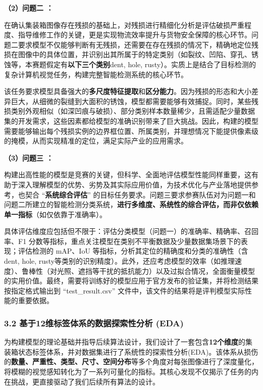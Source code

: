 \documentclass[
]{article}
\begin{document}
\textbf{（2）问题二 ：}

在确认集装箱图像存在残损的基础上，对残损进行精细化分析是评估破损严重程度、指导维修工作的关键，更是实现物流效率提升与货物安全保障的核心环节。问题二要求模型不仅能够判断有无残损，还需要在存在残损的情况下，精确地定位残损在图像中的具体位置，并识别出其所属于的特定类别（如裂纹、凹陷、穿孔、锈蚀等，本赛题假定有\textbf{以下三个类别}dent,
hole,
rusty）。实质上是结合了目标检测的复杂计算机视觉任务，构建完整智能检测系统的核心环节。

该任务要求模型具备强大的\textbf{多尺度特征提取}和\textbf{区分能力}。因为残损的形态和大小差异巨大，从细微的裂缝到大面积的锈蚀，模型都需要能够有效捕捉。同时，某些残损类别外观相似（如深凹痕与破损）、部分类别样本数量稀少，且需适配少量数据集的开发需求，这些因素都给模型的准确识别带来了巨大挑战。因此，构建的模型需要能够输出每个残损实例的边界框位置、所属类别，并理想情况下能提供像素级的掩模，从而实现精准的定位，满足实际产业的应用需求。

\textbf{（3）问题三 ：}

构建出高性能的模型是竞赛的关键，但科学、全面地评估模型性能同样重要，这有助于深入理解模型的优势、劣势及其实际应用价值，为技术优化与产业落地提供参考，也契合
``\textbf{系统综合评估}''
的目标任务要求。问题三要求参赛队伍对为问题一和问题二所建立的智能检测分类系统，\textbf{进行多维度、系统性的综合评估，而非仅依赖单一指标}（如仅依靠于准确率）。

具体评估维度应包括但不限于：评估分类模型（问题一）的准确率、精确率、召回率、F1
分数等指标，重点关注模型在类别不平衡数据及少量数据集场景下的表现；评估检测的
mAP、IoU 等指标，分析其定位的精确度和分类的准确性（含dent, hole,
rusty等类别的识别精度）。此外，还应考虑模型的效率（如推理速度）、鲁棒性（对光照、遮挡等干扰的抵抗能力）以及过拟合情况，全面衡量模型的实用价值。最终，需要将训练好的模型应用于官方发布的验证集，并将检测结果按指定格式输出到
``test\_result.csv''
文件中，该文件的结果将是评判模型实际性能的重要依据。

\subsubsection{3.2 基于12维标签体系的数据探索性分析
(EDA)}\label{32-ux57faux4e8e12ux7ef4ux6807ux7b7eux4f53ux7cfbux7684ux6570ux636eux63a2ux7d22ux6027ux5206ux6790-eda}

为构建模型的理论基础并指导后续算法设计，我们设计了一套包含\textbf{12个维度}的集装箱状态标签体系，并对数据集进行了系统性的探索性分析(EDA)。该体系从损伤的\textbf{数量、严重性、类型、尺寸、空间分布}等多个角度对每张图像进行了深度量化，将模糊的视觉感知转化为了一系列可量化的指标。其核心发现不仅揭示了任务的内在挑战，更直接驱动了我们后续所有算法的设计。
\end{document}
